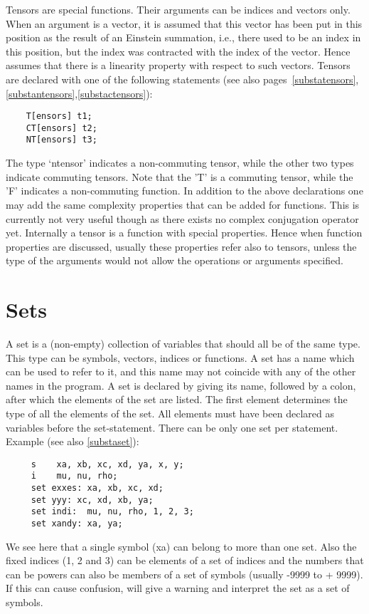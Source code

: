 Tensors are special functions. Their arguments can be 
indices and vectors only. When an argument is a vector, it is assumed that 
this vector has been put in this position as the result of an 
Einstein summation, i.e., there 
used to be an index in this position, but the index was contracted with the 
index of the vector. Hence {\FORM} assumes that there is a linearity 
property with respect to such vectors. Tensors are declared with one of the 
following statements (see also pages~\ref{substatensors},
\ref{substantensors},\ref{substactensors}):
\begin{verbatim}
    T[ensors] t1;
    CT[ensors] t2;
    NT[ensors] t3;
\end{verbatim}
The type `ntensor' indicates a non-commuting tensor, while the other two 
types indicate commuting tensors. Note that the 'T' is a 
commuting tensor, while the 'F' indicates a non-commuting function. In 
addition to the above declarations one may add the same complexity 
properties that can be added for functions. This is currently not very 
useful though as there exists no complex conjugation 
operator yet. Internally a tensor is a function with special properties. 
Hence when function properties are discussed, usually these properties 
refer also to tensors, unless the type of the arguments would not allow 
the operations or arguments specified.

\section{Sets}

\label{sect-sets}
A set is a (non-empty) collection of variables that should 
all be of the same type. This type can be symbols, vectors, indices or 
functions. A set has a name which can be used to refer to 
it, and this name may not coincide with any of the other names in the 
program. A set is declared by giving its name, followed by a 
colon, after which the elements of the set are listed. The first 
element determines the type of all the elements of the set. All 
elements must have been declared as variables before the set-statement. 
There can be only one set per statement. Example (see also 
\ref{substaset}): 
\begin{verbatim}
     s    xa, xb, xc, xd, ya, x, y;
     i    mu, nu, rho;
     set exxes: xa, xb, xc, xd;
     set yyy: xc, xd, xb, ya;
     set indi:  mu, nu, rho, 1, 2, 3;
     set xandy: xa, ya;
\end{verbatim}
We see here that a single symbol (xa) can belong to more than one set. 
Also the fixed indices (1, 2 and 3) can be elements 
of a set of indices and the numbers that can be powers can also be 
members of a set of symbols (usually -9999 to + 9999). If this can cause 
confusion, {\FORM} will give a warning and interpret the set as a 
set of symbols.

